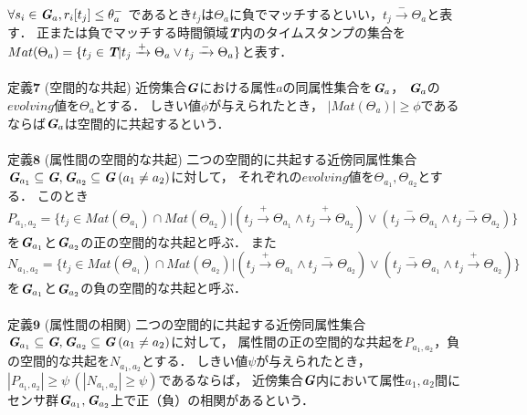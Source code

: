 \documentclass[11pt,j4a]{jarticle}
\begin{document}
$\forall s_{i} \in \textit{\textbf{G}}_{a}, r_{i}[t_{j}] \leq \theta_{a}^{-}$
であるとき$t_{j}$は$\Theta_{a}$に負でマッチするといい，$t_{j} \xrightarrow{-} \Theta_{a}$と表す．
正または負でマッチする時間領域$\textit{\textbf{T}}$内のタイムスタンプの集合を
$Mat(\Theta_{a})=\{t_{j} \in \textit{\textbf{T}}|t_{j} \xrightarrow{+} \Theta_{a} \lor
t_{j} \xrightarrow{-} \Theta_{a}\}$と表す．
\\\\
$\textbf{定義7}$ \hspace{2pt} ($\textbf{空間的な共起}$) \hspace{2pt}
近傍集合$\textit{\textbf{G}}$における属性$a$の同属性集合を$\textit{\textbf{G}}_{a}$，
$\textit{\textbf{G}}_{a}$の$evolving値$を$\Theta_{a}$とする．
しきい値$\phi$が与えられたとき，
$|Mat(\Theta_{a})| \geq \phi$であるならば$\textit{\textbf{G}}_{a}$は空間的に共起するという．
\\\\
$\textbf{定義8}$ \hspace{2pt} ($\textbf{属性間の空間的な共起}$) \hspace{2pt}
二つの空間的に共起する近傍同属性集合$\textit{\textbf{G}}_{a_{1}} \subseteq \textit{\textbf{G}},
\textit{\textbf{G}}_{a_{2}} \subseteq \textit{\textbf{G}} \hspace{2pt} (a_{1} \neq a_{2})$に対して，
それぞれの$evolving値$を$\Theta_{a_{1}},\Theta_{a_{2}}$とする．
このとき$P_{a_{1},a_{2}}=\{t_{j} \in Mat(\Theta_{a_{1}}) \cap Mat(\Theta_{a_{2}})|
(t_{j} \xrightarrow{+} \Theta_{a_{1}} \land t_{j} \xrightarrow{+} \Theta_{a_{2}}) \lor
(t_{j} \xrightarrow{-} \Theta_{a_{1}} \land t_{j} \xrightarrow{-} \Theta_{a_{2}})\}$
を$\textit{\textbf{G}}_{a_{1}}$と$\textit{\textbf{G}}_{a_{2}}$の正の空間的な共起と呼ぶ．
また$N_{a_{1},a_{2}}=\{t_{j} \in Mat(\Theta_{a_{1}}) \cap Mat(\Theta_{a_{2}})|
(t_{j} \xrightarrow{+} \Theta_{a_{1}} \land t_{j} \xrightarrow{-} \Theta_{a_{2}}) \lor
(t_{j} \xrightarrow{-} \Theta_{a_{1}} \land t_{j} \xrightarrow{+} \Theta_{a_{2}})\}$
を$\textit{\textbf{G}}_{a_{1}}$と$\textit{\textbf{G}}_{a_{2}}$の負の空間的な共起と呼ぶ．
\\\\
$\textbf{定義9}$ \hspace{2pt} ($\textbf{属性間の相関}$) \hspace{2pt}
二つの空間的に共起する近傍同属性集合$\textit{\textbf{G}}_{a_{1}} \subseteq \textit{\textbf{G}},
\textit{\textbf{G}}_{a_{2}} \subseteq \textit{\textbf{G}} \hspace{2pt} (a_{1} \neq a_{2})$に対して，
属性間の正の空間的な共起を$P_{a_{1},a_{2}}$，負の空間的な共起を$N_{a_{1},a_{2}}$とする．
しきい値$\psi$が与えられたとき，$|P_{a_{1},a_{2}}| \geq \psi \hspace{2pt} (|N_{a_{1},a_{2}}| \geq \psi)$であるならば，
近傍集合$\textit{\textbf{G}}$内において属性$a_{1},a_{2}$間にセンサ群$\textit{\textbf{G}}_{a_{1}},
\textit{\textbf{G}}_{a_{2}}$上で正（負）の相関があるという．
\end{document}
